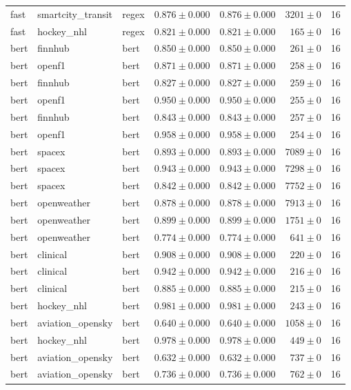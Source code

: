 \begin{table}[htbp]
\begin{tabular}{l l l r r r r}
fast & smartcity\_transit & regex & $0.876\pm0.000$ & $0.876\pm0.000$ & $3201\pm0$ & 16 \\
fast & hockey\_nhl & regex & $0.821\pm0.000$ & $0.821\pm0.000$ & $165\pm0$ & 16 \\
bert & finnhub & bert & $0.850\pm0.000$ & $0.850\pm0.000$ & $261\pm0$ & 16 \\
bert & openf1 & bert & $0.871\pm0.000$ & $0.871\pm0.000$ & $258\pm0$ & 16 \\
bert & finnhub & bert & $0.827\pm0.000$ & $0.827\pm0.000$ & $259\pm0$ & 16 \\
bert & openf1 & bert & $0.950\pm0.000$ & $0.950\pm0.000$ & $255\pm0$ & 16 \\
bert & finnhub & bert & $0.843\pm0.000$ & $0.843\pm0.000$ & $257\pm0$ & 16 \\
bert & openf1 & bert & $0.958\pm0.000$ & $0.958\pm0.000$ & $254\pm0$ & 16 \\
bert & spacex & bert & $0.893\pm0.000$ & $0.893\pm0.000$ & $7089\pm0$ & 16 \\
bert & spacex & bert & $0.943\pm0.000$ & $0.943\pm0.000$ & $7298\pm0$ & 16 \\
bert & spacex & bert & $0.842\pm0.000$ & $0.842\pm0.000$ & $7752\pm0$ & 16 \\
bert & openweather & bert & $0.878\pm0.000$ & $0.878\pm0.000$ & $7913\pm0$ & 16 \\
bert & openweather & bert & $0.899\pm0.000$ & $0.899\pm0.000$ & $1751\pm0$ & 16 \\
bert & openweather & bert & $0.774\pm0.000$ & $0.774\pm0.000$ & $641\pm0$ & 16 \\
bert & clinical & bert & $0.908\pm0.000$ & $0.908\pm0.000$ & $220\pm0$ & 16 \\
bert & clinical & bert & $0.942\pm0.000$ & $0.942\pm0.000$ & $216\pm0$ & 16 \\
bert & clinical & bert & $0.885\pm0.000$ & $0.885\pm0.000$ & $215\pm0$ & 16 \\
bert & hockey\_nhl & bert & $0.981\pm0.000$ & $0.981\pm0.000$ & $243\pm0$ & 16 \\
bert & aviation\_opensky & bert & $0.640\pm0.000$ & $0.640\pm0.000$ & $1058\pm0$ & 16 \\
bert & hockey\_nhl & bert & $0.978\pm0.000$ & $0.978\pm0.000$ & $449\pm0$ & 16 \\
bert & aviation\_opensky & bert & $0.632\pm0.000$ & $0.632\pm0.000$ & $737\pm0$ & 16 \\
bert & aviation\_opensky & bert & $0.736\pm0.000$ & $0.736\pm0.000$ & $762\pm0$ & 16 \\

\end{tabular}
\end{table}
